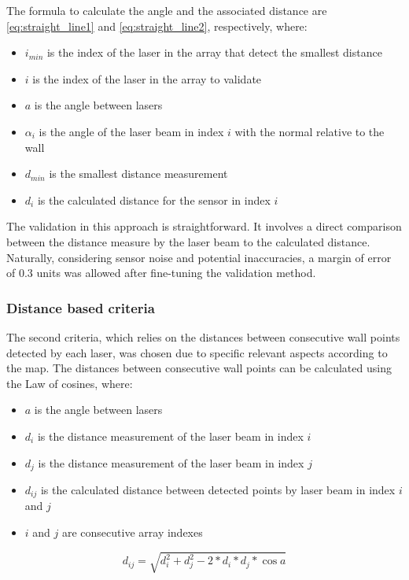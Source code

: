 \documentclass[conference]{IEEEtran}
\begin{document}
The formula to calculate the angle and the associated distance are \ref{eq:straight_line1} and \ref{eq:straight_line2}, respectively, where:
\begin{itemize}
    \item $i_{min}$ is the index of the laser in the array that detect the smallest distance
    \item $i$ is the index of the laser in the array to validate
    \item $a$ is the angle between lasers
    \item $\alpha_i$ is the angle of the laser beam in index $i$ with the normal relative to the wall
    \item $d_{min}$ is the smallest distance measurement
    \item $d_i$ is the calculated distance for the sensor in index $i$
\end{itemize}

The validation in this approach is straightforward. It involves a direct comparison between the distance measure by the laser beam to the calculated distance. Naturally, considering sensor noise and potential inaccuracies, a margin of error of 0.3 units was allowed after fine-tuning the validation method.

\subsubsection{Distance based criteria}

The second criteria, which relies on the distances between consecutive wall points detected by each laser, was chosen due to specific relevant aspects according to the map. The distances between consecutive wall points can be calculated using the Law of cosines, where:
\begin{itemize}
    \item $a$ is the angle between lasers
    \item $d_i$ is the distance measurement of the laser beam in index $i$
    \item $d_j$ is the distance measurement of the laser beam in index $j$
    \item $d_{ij}$ is the calculated distance between detected points by laser beam in index $i$ and $j$
    \item $i$ and $j$ are consecutive array indexes
\end{itemize}

\begin{equation} \label{eq:distances}
    d_{ij} = \sqrt{ d_i^2 + d_j^2 - 2 * d_i * d_j * \cos{a} }
\end{equation}
\end{document}
